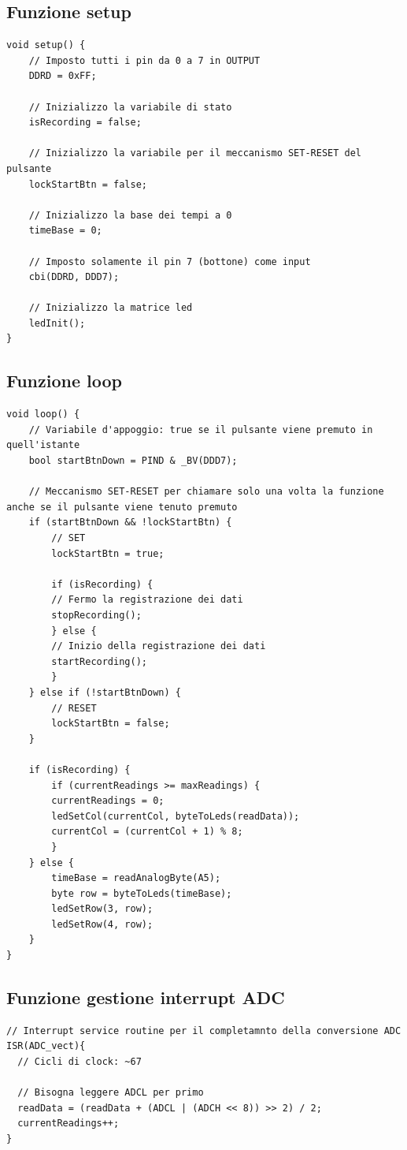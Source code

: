 \documentclass{article}
\begin{document}
\subsection{Funzione setup}
\begin{lstlisting}[]
void setup() {
    // Imposto tutti i pin da 0 a 7 in OUTPUT
    DDRD = 0xFF;
    
    // Inizializzo la variabile di stato
    isRecording = false;
    
    // Inizializzo la variabile per il meccanismo SET-RESET del pulsante
    lockStartBtn = false;
    
    // Inizializzo la base dei tempi a 0
    timeBase = 0;
    
    // Imposto solamente il pin 7 (bottone) come input
    cbi(DDRD, DDD7);
    
    // Inizializzo la matrice led
    ledInit();
}
\end{lstlisting}
\newpage

\subsection{Funzione loop}
\begin{lstlisting}[]
void loop() {
    // Variabile d'appoggio: true se il pulsante viene premuto in quell'istante
    bool startBtnDown = PIND & _BV(DDD7);
    
    // Meccanismo SET-RESET per chiamare solo una volta la funzione anche se il pulsante viene tenuto premuto
    if (startBtnDown && !lockStartBtn) {
        // SET
        lockStartBtn = true;
        
        if (isRecording) {
        // Fermo la registrazione dei dati
        stopRecording();
        } else {
        // Inizio della registrazione dei dati
        startRecording();
        }
    } else if (!startBtnDown) {
        // RESET
        lockStartBtn = false;
    }
    
    if (isRecording) {
        if (currentReadings >= maxReadings) {
        currentReadings = 0;
        ledSetCol(currentCol, byteToLeds(readData));
        currentCol = (currentCol + 1) % 8;
        }
    } else {
        timeBase = readAnalogByte(A5);
        byte row = byteToLeds(timeBase);
        ledSetRow(3, row);
        ledSetRow(4, row);
    }
}
\end{lstlisting}

\subsection{Funzione gestione interrupt ADC}
\begin{lstlisting}[]
// Interrupt service routine per il completamnto della conversione ADC
ISR(ADC_vect){
  // Cicli di clock: ~67
  
  // Bisogna leggere ADCL per primo
  readData = (readData + (ADCL | (ADCH << 8)) >> 2) / 2;
  currentReadings++;
}
\end{lstlisting}
\end{document}
